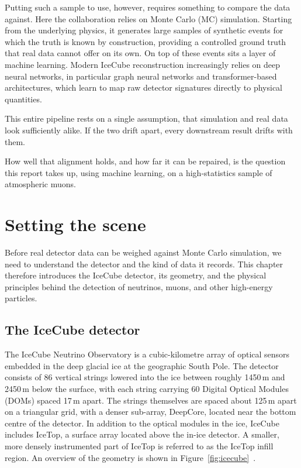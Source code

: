 Putting such a sample to use, however, requires something to compare the data against. Here the collaboration relies on Monte Carlo (MC) simulation. Starting from the underlying physics, it generates large samples of synthetic events for which the truth is known by construction, providing a controlled ground truth that real data cannot offer on its own. On top of these events sits a layer of machine learning. Modern IceCube reconstruction increasingly relies on deep neural networks, in particular graph neural networks and transformer-based architectures, which learn to map raw detector signatures directly to physical quantities.

This entire pipeline rests on a single assumption, that simulation and real data look sufficiently alike. If the two drift apart, every downstream result drifts with them.

How well that alignment holds, and how far it can be repaired, is the question this report takes up, using machine learning, on a high-statistics sample of atmospheric muons.


\chapter{Setting the scene}
\label{ch:setting_scene}

Before real detector data can be weighed against Monte Carlo simulation, we need to understand the detector and the kind of data it records. This chapter therefore introduces the IceCube detector, its geometry, and the physical principles behind the detection of neutrinos, muons, and other high-energy particles.

\section{The IceCube detector}

The IceCube Neutrino Observatory is a cubic-kilometre array of optical sensors embedded in the deep glacial ice at the geographic South Pole. The detector consists of 86 vertical strings lowered into the ice between roughly 1450\,m and 2450\,m below the surface, with each string carrying 60 Digital Optical Modules (DOMs) spaced 17\,m apart. The strings themselves are spaced about 125\,m apart on a triangular grid, with a denser sub-array, DeepCore, located near the bottom centre of the detector. In addition to the optical modules in the ice, IceCube includes IceTop, a surface array located above the in-ice detector. A smaller, more densely instrumented part of IceTop is referred to as the IceTop infill region. An overview of the geometry is shown in Figure~\ref{fig:icecube}~\cite{IceCube2017}.

